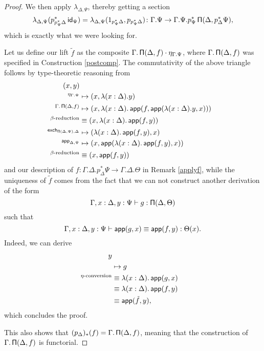 \begin{proof}
\noindent
  We then apply $\lambda_{\Delta,\Psi}$, thereby getting a section
  \[\lambda_{\Delta,\Psi}(p^*_{p^*_\Psi\Delta}\operatorname{\mathsf{id}}_\Psi)
    =\lambda_{\Delta,\Psi}(1_{p^*_\Psi\Delta},p_{p^*_\Psi\Delta})
\colon\Gamma.\Psi\rightarrow\Gamma.\Psi.p^*_\Psi\operatorname{\mathsf{\Pi}}(\Delta,p^*_\Delta\Psi),\]
  which is exactly what we were looking for.

  \noindent
  Let us define our lift $\tilde{f}$ as the composite
  $\Gamma.\operatorname{\mathsf{\Pi}}(\Delta,f)\cdot\eta_{\Gamma.\Psi}$, where $\Gamma.\operatorname{\mathsf{\Pi}}(\Delta,f)$
  was specified in Construction \ref{postcomp}. The commutativity of the above
  triangle follows by type-theoretic reasoning from
  \begin{align*}
    (x,y) \\
    ^{\eta_{\Gamma.\Psi}}
    &\mapsto(x,\lambda(x:\Delta).y) \\
    ^{\Gamma.\operatorname{\mathsf{\Pi}}(\Delta,f)}
    &\mapsto(x,\lambda(x:\Delta).\operatorname{\mathsf{app}}(f,\operatorname{\mathsf{app}}(\lambda(x:\Delta).y,x))) \\
    ^{\beta\text{-reduction}}
    &\equiv(x,\lambda(x:\Delta).\operatorname{\mathsf{app}}(f,y)) \\
    ^{\operatorname{\mathsf{exch}}_{\operatorname{\mathsf{\Pi}}(\Delta,\Psi),\Delta}}
    &\mapsto(\lambda(x:\Delta).\operatorname{\mathsf{app}}(f,y),x) \\
    ^{\operatorname{\mathsf{app}}_{\Delta,\Psi}}
    &\mapsto(x,\operatorname{\mathsf{app}}(\lambda(x:\Delta).\operatorname{\mathsf{app}}(f,y),x)) \\
    ^{\beta\text{-reduction}}
    &\equiv(x,\operatorname{\mathsf{app}}(f,y))
  \end{align*}
  and our description of
  $f\colon\Gamma.\Delta.p^*_\Delta\Psi\rightarrow\Gamma.\Delta.\Theta$ in
  Remark \ref{applyf}, while the
  uniqueness of $\tilde{f}$ comes from the fact that we can not construct
  another derivation of the form
  \[\Gamma,x:\Delta,y:\Psi\vdash g:\operatorname{\mathsf{\Pi}}(\Delta,\Theta)\]
  such that
  \[\Gamma,x:\Delta,y:\Psi\vdash\operatorname{\mathsf{app}}(g,x)\equiv\operatorname{\mathsf{app}}(f,y):\Theta(x).\]
  Indeed, we can derive
  \begin{align*}
    y \\
        &\mapsto g \\
        ^{\eta\text{-conversion}}&\equiv\lambda(x:\Delta).\operatorname{\mathsf{app}}(g,x) \\
        &\equiv\lambda(x:\Delta).\operatorname{\mathsf{app}}(f,y) \\
        &\equiv\operatorname{\mathsf{app}}(\tilde{f},y),
  \end{align*}
  which concludes the proof.

  \noindent
  This also shows that $(p_{\Delta})_*(f)=\Gamma.\operatorname{\mathsf{\Pi}}(\Delta,f)$, meaning that
  the construction of $\Gamma.\operatorname{\mathsf{\Pi}}(\Delta,f)$ is functorial.
\end{proof}


